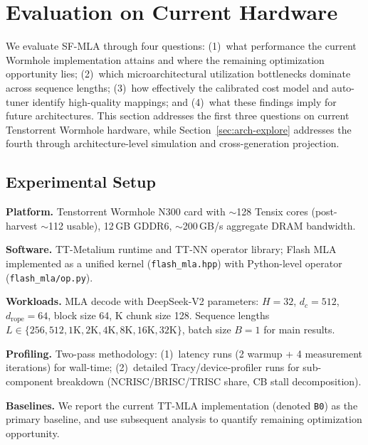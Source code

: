 \documentclass[sigconf, review, anonymous]{acmart}
\newcommand{\brand}{SF-MLA}
\newcommand{\sysname}{\textsc{\brand}\xspace}
\newcommand{\autoTuner}{auto-tuner}
\begin{document}
\section{Evaluation on Current Hardware}\label{sec:eval}

We evaluate \sysname through four questions:
(1)~what performance the current Wormhole implementation attains and
where the remaining optimization opportunity lies;
(2)~which microarchitectural utilization bottlenecks dominate across
sequence lengths;
(3)~how effectively the calibrated cost model and \autoTuner{} identify
high-quality mappings; and
(4)~what these findings imply for future architectures.
This section addresses the first three questions on current
Tenstorrent Wormhole hardware, while
Section~\ref{sec:arch-explore} addresses the fourth through
architecture-level simulation and cross-generation projection.



\subsection{Experimental Setup}\label{sec:eval-setup}

\textbf{Platform.}  Tenstorrent Wormhole N300 card with
$\sim$128 Tensix cores (post-harvest $\sim$112 usable), 12\,GB GDDR6,
$\sim$200\,GB/s aggregate DRAM bandwidth.

\textbf{Software.}  TT-Metalium runtime and TT-NN operator library;
Flash MLA implemented as a unified kernel
(\texttt{flash\_mla.hpp}) with Python-level operator
(\texttt{flash\_mla/op.py}).

\textbf{Workloads.}  MLA decode with DeepSeek-V2 parameters:
$H{=}32$, $d_c{=}512$, $d_{\mathrm{rope}}{=}64$, block size 64,
K chunk size 128.  Sequence lengths $L \in \{256, 512, 1\text{K},
2\text{K}, 4\text{K}, 8\text{K}, 16\text{K}, 32\text{K}\}$,
batch size $B{=}1$ for main results.

\textbf{Profiling.}  Two-pass methodology: (1)~latency runs
(2 warmup + 4 measurement iterations) for wall-time;
(2)~detailed Tracy/device-profiler runs for sub-component breakdown
(NCRISC/BRISC/TRISC share, CB stall decomposition).

\textbf{Baselines.}  We report the current TT-MLA implementation
(denoted \texttt{B0}) as the primary baseline, and use subsequent
analysis to quantify remaining optimization opportunity.
\end{document}
